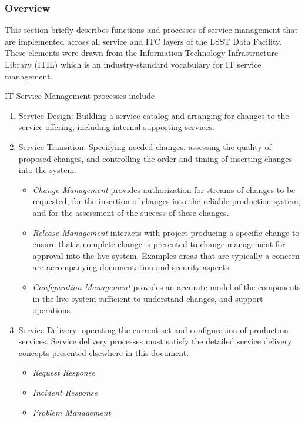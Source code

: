 \subsubsection{Overview}
This section briefly describes functions and processes of service management that are implemented across all service and ITC layers of the LSST Data Facility. These elements were drawn from the Information Technology Infrastructure Library (ITIL) which is an industry-standard vocabulary for IT service management.

IT Service Management processes include

\begin{enumerate}

\item Service Design: Building a service catalog and arranging for changes to the service offering, including internal supporting services.

\item Service Transition: Specifying needed changes, assessing the quality of proposed changes,
and controlling the order and timing of inserting changes into the system.

  \begin{itemize}
 
  \item \emph{Change Management} provides authorization for streams of changes to be requested, for the insertion of changes into the reliable production system, and for the assessment of the success of these changes.

  \item \emph{Release Management} interacts with project producing a specific change to ensure that
a complete change is presented to change management for approval into the live system. Examples areas that are typically a concern are accompanying documentation and security aspects.

  \item \emph{Configuration Management} provides an accurate model of the components in the live system sufficient to understand changes, and support operations.
 
  \end{itemize}

\item Service Delivery: operating the current set and configuration of production services. Service delivery processes must satisfy the detailed service delivery concepts presented elsewhere in this document.

  \begin{itemize}
  
  \item \emph{Request Response}
  
  \item \emph{Incident Response}
  
  \item \emph{Problem Management}
  
  \end{itemize}
  
\end{enumerate}